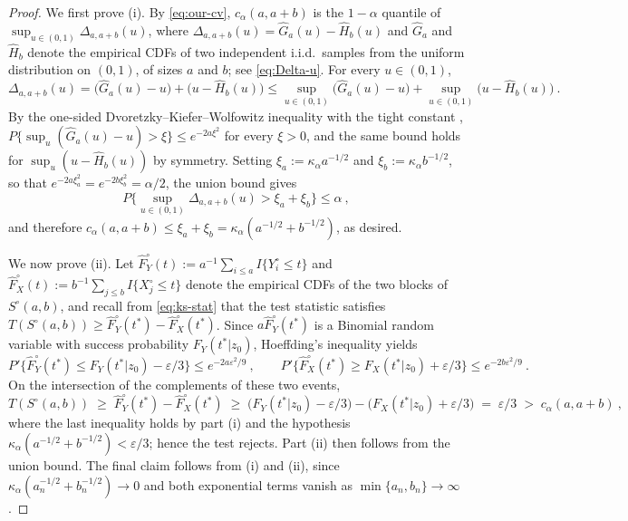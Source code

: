 \documentclass[11pt]{article}
\numberwithin{equation}{section}
\begin{document}
\begin{proof}
  We first prove (i). By \eqref{eq:our-cv}, $c_\alpha(a,a+b)$ is the $1-\alpha$ quantile of $\sup_{u\in(0,1)}\Delta_{a,a+b}(u)$, where $\Delta_{a,a+b}(u)=\hat G_a(u)-\hat H_b(u)$ and $\hat G_a$ and $\hat H_b$ denote the empirical CDFs of two independent i.i.d.\ samples from the uniform distribution on $(0,1)$, of sizes $a$ and $b$; see \eqref{eq:Delta-u}. For every $u\in(0,1)$,
  \begin{equation*}
   \Delta_{a,a+b}(u)=\big(\hat G_a(u)-u\big)+\big(u-\hat H_b(u)\big)
   \le \sup_{u\in(0,1)}\big(\hat G_a(u)-u\big)+\sup_{u\in(0,1)}\big(u-\hat H_b(u)\big)~.
  \end{equation*}
  By the one-sided Dvoretzky--Kiefer--Wolfowitz inequality with the tight constant \citep[Theorem 1]{massart:90}, $P\{\sup_u(\hat G_a(u)-u)>\xi\}\le e^{-2a\xi^2}$ for every $\xi>0$, and the same bound holds for $\sup_u(u-\hat H_b(u))$ by symmetry. Setting $\xi_a:=\kappa_\alpha a^{-1/2}$ and $\xi_b:=\kappa_\alpha b^{-1/2}$, so that $e^{-2a\xi_a^2}=e^{-2b\xi_b^2}=\alpha/2$, the union bound gives
  \begin{equation*}
   P\Big\{\sup_{u\in(0,1)}\Delta_{a,a+b}(u)>\xi_a+\xi_b\Big\}\le\alpha~,
  \end{equation*}
  and therefore $c_\alpha(a,a+b)\le \xi_a+\xi_b=\kappa_\alpha(a^{-1/2}+b^{-1/2})$, as desired.

  We now prove (ii). Let $\hat F^{\circ}_Y(t):=a^{-1}\sum_{i\le a}I\{Y^{\circ}_i\le t\}$ and $\hat F^{\circ}_X(t):=b^{-1}\sum_{j\le b}I\{X^{\circ}_j\le t\}$ denote the empirical CDFs of the two blocks of $S^{\circ}(a,b)$, and recall from \eqref{eq:ks-stat} that the test statistic satisfies $T(S^{\circ}(a,b))\ge \hat F^{\circ}_Y(t^*)-\hat F^{\circ}_X(t^*)$. Since $a\hat F^{\circ}_Y(t^*)$ is a Binomial random variable with success probability $F_Y(t^*|z_0)$, Hoeffding's inequality yields
  \begin{equation*}
   P'\Big\{\hat F^{\circ}_Y(t^*)\le F_Y(t^*|z_0)-\varepsilon/3\Big\}\le e^{-2a\varepsilon^2/9}~,
   \qquad
   P'\Big\{\hat F^{\circ}_X(t^*)\ge F_X(t^*|z_0)+\varepsilon/3\Big\}\le e^{-2b\varepsilon^2/9}~.
  \end{equation*}
  On the intersection of the complements of these two events,
  \begin{equation*}
   T(S^{\circ}(a,b))\;\ge\;\hat F^{\circ}_Y(t^*)-\hat F^{\circ}_X(t^*)
   \;\ge\;\big(F_Y(t^*|z_0)-\varepsilon/3\big)-\big(F_X(t^*|z_0)+\varepsilon/3\big)
   \;=\;\varepsilon/3
   \;>\;c_\alpha(a,a+b)~,
  \end{equation*}
  where the last inequality holds by part (i) and the hypothesis $\kappa_\alpha(a^{-1/2}+b^{-1/2})<\varepsilon/3$; hence the test rejects. Part (ii) then follows from the union bound. The final claim follows from (i) and (ii), since $\kappa_\alpha(a_n^{-1/2}+b_n^{-1/2})\to0$ and both exponential terms vanish as $\min\{a_n,b_n\}\to\infty$.
  \end{proof}
\end{document}
